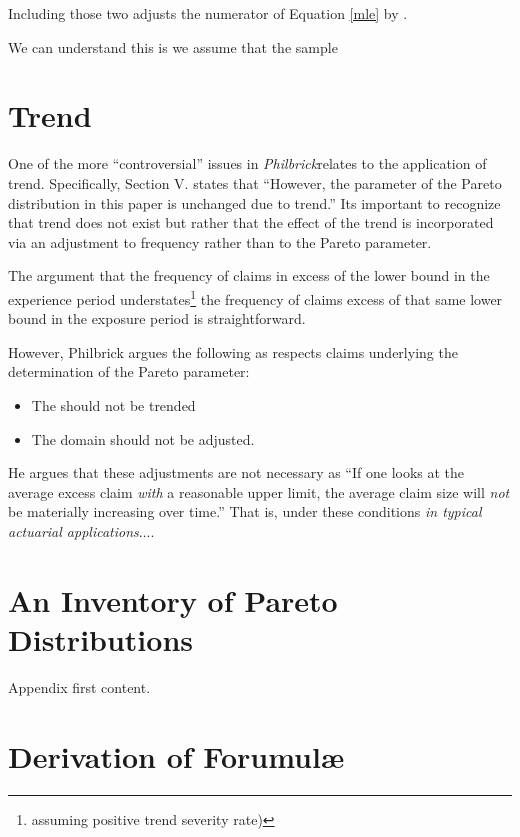 \documentclass[]{article} %
\newcommand{\philbrick}{\textit{Philbrick}}
\begin{document}
Including those two adjusts the numerator of Equation \ref{mle} by .  


We can understand this is we assume that the sample 


 
\section{Trend}
One of the more ``controversial'' issues in \philbrick relates to the application of trend. Specifically, Section V. states that ``However, the parameter of the Pareto distribution in this paper is unchanged due to trend.'' Its important to recognize that trend does not exist but rather that the effect of the trend is incorporated via an adjustment to frequency rather than to the Pareto parameter.

The argument that the frequency of claims in excess of the lower bound in the experience period understates\footnote{assuming positive trend severity rate)} the frequency of claims excess of that same lower bound in the exposure period is straightforward.

However, Philbrick argues the following as respects claims underlying the determination of the Pareto parameter:
\begin{itemize}
	\item The should not be trended
	\item The domain should not be adjusted. 
\end{itemize}
He argues that these adjustments are not necessary as ``If one looks at the average excess claim \textit{with} a reasonable upper limit, the average claim size will \textit{not} be materially increasing over time.'' That is, under these conditions \textit{in typical actuarial applications}....








\newpage
\appendix
\appendixpage

\section{An Inventory of Pareto Distributions}\label{ParetoInventory}
Appendix first content.
\section{Derivation of Forumul\ae}
\end{document}

